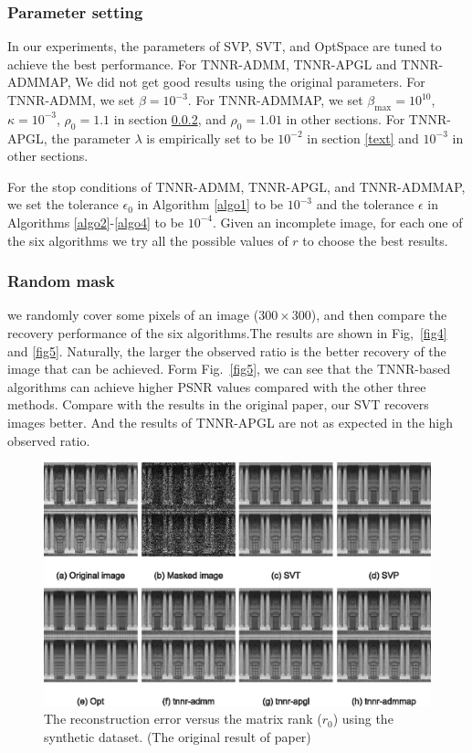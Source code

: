 \documentclass{article}
\begin{document}
{\subsubsection{Parameter setting}
In our experiments, the parameters of SVP, SVT, and OptSpace are tuned to achieve the best performance. For TNNR-ADMM, TNNR-APGL and TNNR-ADMMAP, We did not get good results using the original parameters. For TNNR-ADMM, we set $\beta = 10^{-3}$. For TNNR-ADMMAP, we set $\beta_{\max} = 10^{10}$, $\kappa = 10^{-3}$, $\rho_0 = 1.1$ in section \ref{random}, and $\rho_0 = 1.01$ in other sections. For TNNR-APGL, the parameter $\lambda$ is empirically set to be $10^{-2}$ in section \ref{text} and $10^{-3}$ in other sections.
  
For the stop conditions of TNNR-ADMM, TNNR-APGL, and TNNR-ADMMAP, we set the tolerance $\epsilon_0$ in Algorithm \ref{algo1} to be $10^{-3}$ and the tolerance $\epsilon$ in Algorithms \ref{algo2}-\ref{algo4} to be $10^{-4}$. Given an incomplete image, for each one of the six algorithms we try all the possible values of $r$ to choose the best results.

\subsubsection{Random mask}
\label{random}
we randomly cover some pixels of an image ($300 \times 300$), and then compare the recovery performance of the six algorithms.The results are shown in Fig,~\ref{fig4} and \ref{fig5}. Naturally, the larger the observed ratio is the better recovery of the image that can be achieved. Form Fig.~\ref{fig5}, we can see that the TNNR-based algorithms can achieve higher PSNR values compared with the other three methods. Compare with the results in the original paper, our SVT recovers images better. And the results of TNNR-APGL are not as expected in the high observed ratio.

\begin{figure}[ht]
    \centering
    \includegraphics[]{./assets/fig4.eps}
    \caption{The reconstruction error versus the matrix rank ($r_0$) using the synthetic dataset. (The original result of paper)\label{fig4ori}}
    

\end{figure}}
\end{document}
